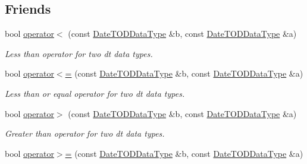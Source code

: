 \subsection*{Friends}
\begin{DoxyCompactItemize}
\item 
bool \hyperlink{structpc__emulator_1_1DateTODDataType_a19e48a0fa1dfbad95a2cde6a4e9d9a8f}{operator$<$} (const \hyperlink{structpc__emulator_1_1DateTODDataType}{Date\+T\+O\+D\+Data\+Type} \&b, const \hyperlink{structpc__emulator_1_1DateTODDataType}{Date\+T\+O\+D\+Data\+Type} \&a)\hypertarget{structpc__emulator_1_1DateTODDataType_a19e48a0fa1dfbad95a2cde6a4e9d9a8f}{}\label{structpc__emulator_1_1DateTODDataType_a19e48a0fa1dfbad95a2cde6a4e9d9a8f}

\begin{DoxyCompactList}\small\item\em Less than operator for two dt data types. \end{DoxyCompactList}\item 
bool \hyperlink{structpc__emulator_1_1DateTODDataType_a8a4ba8113332a3ada78f1cdfd91c828f}{operator$<$=} (const \hyperlink{structpc__emulator_1_1DateTODDataType}{Date\+T\+O\+D\+Data\+Type} \&b, const \hyperlink{structpc__emulator_1_1DateTODDataType}{Date\+T\+O\+D\+Data\+Type} \&a)\hypertarget{structpc__emulator_1_1DateTODDataType_a8a4ba8113332a3ada78f1cdfd91c828f}{}\label{structpc__emulator_1_1DateTODDataType_a8a4ba8113332a3ada78f1cdfd91c828f}

\begin{DoxyCompactList}\small\item\em Less than or equal operator for two dt data types. \end{DoxyCompactList}\item 
bool \hyperlink{structpc__emulator_1_1DateTODDataType_a3f3ead1153a14c1d7806acb8486d14c0}{operator$>$} (const \hyperlink{structpc__emulator_1_1DateTODDataType}{Date\+T\+O\+D\+Data\+Type} \&b, const \hyperlink{structpc__emulator_1_1DateTODDataType}{Date\+T\+O\+D\+Data\+Type} \&a)\hypertarget{structpc__emulator_1_1DateTODDataType_a3f3ead1153a14c1d7806acb8486d14c0}{}\label{structpc__emulator_1_1DateTODDataType_a3f3ead1153a14c1d7806acb8486d14c0}

\begin{DoxyCompactList}\small\item\em Greater than operator for two dt data types. \end{DoxyCompactList}\item 
bool \hyperlink{structpc__emulator_1_1DateTODDataType_ac13253f7b93b0c57e0d3408aa42b70bc}{operator$>$=} (const \hyperlink{structpc__emulator_1_1DateTODDataType}{Date\+T\+O\+D\+Data\+Type} \&b, const \hyperlink{structpc__emulator_1_1DateTODDataType}{Date\+T\+O\+D\+Data\+Type} \&a)\hypertarget{structpc__emulator_1_1DateTODDataType_ac13253f7b93b0c57e0d3408aa42b70bc}{}\label{structpc__emulator_1_1DateTODDataType_ac13253f7b93b0c57e0d3408aa42b70bc}


\end{DoxyCompactItemize}
